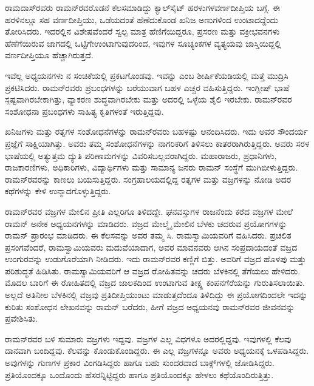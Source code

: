 ರಾಮದಾಸ್‍ರವರು ರಾಮನ್‍ರವರೊಡನೆ ಕೆಲಸಮಾಡಿದ್ದು ಕ್ಯಾಲ್‍ಸೈಟ್ ಹರಳುಗಳ\break ವರ್ಣದೀಪ್ತಿಯ ಬಗ್ಗೆ. ಈ ಹರಳಿನಲ್ಲೂ ಸಹ ವರ್ಣದೀಪ್ತಿಯು, ಒಡೆಯದಂತೆ ಹೆಣೆದುಕೊಂಡ ಖನಿಜ ಅಣುಗಳಿಂದ ಉಂಟಾದದ್ದೆಂದು ತೋರಿಸಿದರು. ಇದರಲ್ಲಿನ ವಿಶೇಷವೆಂದರೆ ಸ್ವಲ್ಪ ಮಾತ್ರ ಹೆಣಿಗೆಯಿದ್ದರೂ, ಪ್ರಸರಣ ಮತ್ತು ವಕ್ರೀಭವನಗಳು ಹೆಣೆಗೆಯಿರುವ ಜಾಗದಲ್ಲಿ ಒಟ್ಟಿಗೇ\break ಉಂಟಾಗುವುದರಿಂದ, ಇವುಗಳ ಸೂಚ್ಯಂಕಗಳ ವ್ಯತ್ಯಯವು ಜಾಸ್ತಿಯಿದ್ದಲ್ಲಿ ವರ್ಣದೀಪ್ತಿಯೂ ಹೆಚ್ಚಾಗಿರುತ್ತದೆ.

ಇವೆಲ್ಲ ಅಧ್ಯಯನಗಳು \textit{}ನ ಸಂಚಿಕೆಯಲ್ಲಿ ಪ್ರಕಟಗೊಂಡವು. ಇವನ್ನು \textit{} ಎಂಬ ಶೀರ್ಷಿಕೆಯಡಿ\-ಯಲ್ಲಿ ಮತ್ತೆ ಮುದ್ರಿಸಿ ಪ್ರಕಟಿಸಿದರು. ರಾಮನ್‍ರವರು ಪ್ರಬಂಧಗಳನ್ನು ಬರೆಯುವಾಗ ಬಹಳ ಎಚ್ಚರ ವಹಿಸುತ್ತಿದ್ದರು. ಇಂಗ್ಲೀಷ್ ಭಾಷೆ ಸ್ಪಷ್ಟವಾಗಿರಬೇಕಾಗಿತ್ತು, ವ್ಯಾಕರಣ ಶುದ್ಧವಾಗಿರಬೇಕು ಮತ್ತು ಅದರಲ್ಲಿ ಒಳ್ಳೆಯ ಶೈಲಿ ಇರಬೇಕು. ರಾಮನ್‍ರವರ ಸಂಶೋಧನಾ ಪ್ರಬಂಧಗಳು ಸಾಹಿತ್ಯ ಕೃತಿಗಳಂತೆ ಇರುತ್ತಿದ್ದವು.

ಖನಿಜಗಳು ಮತ್ತು ರತ್ನಗಳ ಸಂಶೋಧನೆಗಳನ್ನು ರಾಮನ್‍ರವರು ಬಹಳಷ್ಟು ಆನಂದಿಸಿದರು. ಇದು ಅವರ ಸೌಂದರ್ಯ ಪ್ರಜ್ಞೆಗೆ ಸಾಕ್ಷಿಯಾಗಿತ್ತು. ಅವರು ತಮ್ಮ ಸಂಶೋಧನೆಗಳನ್ನು ನಾಗರಿಕರಿಗೆ ತಿಳಿಸಲು ಕಾತರರಾಗಿರುತ್ತಿದ್ದರು. ಅವರು ಸರಳ ಭಾಷೆಯಲ್ಲಿ ಅತ್ಯುತ್ತಮ ದ್ಯುತಿ ಪರಿಣಾಮಗಳನ್ನು ವಿವರಿಸಬಲ್ಲವರಾಗಿದ್ದರು. ಮಹಾರಾಜರು, ಪ್ರಧಾನಿಗಳು, ರಾಜಕಾರಣಿಗಳು, ಅಧಿಕಾರಿಗಳು, ವಿದ್ಯಾರ್ಥಿಗಳು ಮತ್ತು ಸಾಮಾನ್ಯ ಜನರು ರಾಮನ್ ಸಂಸ್ಥೆಗೆ ಮುಗಿಬೀಳುತ್ತಿದ್ದರು. ರಾಮನ್‍ರವರನ್ನು ಕಾಣಲು ಬಯಸುತ್ತಿದ್ದರು. ಸಂಗ್ರಹಾಲಯದಲ್ಲಿದ್ದ ರತ್ನಗಳ ಮತ್ತು ವಜ್ರಗಳನ್ನು ನೋಡಿ ಅದರ ಕಥೆಗಳನ್ನು ಕೇಳಿ ಉನ್ಮಾದಗೊಳ್ಳುತ್ತಿದ್ದರು.



ರಾಮನ್‍ರವರ ವಜ್ರಗಳ ಮೇಲಿನ ಪ್ರೀತಿ ಎಲ್ಲರಿಗೂ ತಿಳಿದದ್ದೇ. ಘನವಸ್ತುಗಳ ರಾಜನೆಂದು ಕರೆದ ವಜ್ರಗಳ ಮೇಲೆ ರಾಮನ್ ಅನೇಕ ಅಧ್ಯಯನಗಳನ್ನು ಮಾಡಿದರು. ವಜ್ರದ ಮೇಲ್ಮೈ ಮೇಲಿನ ಬೆಳಕು ಚದರುವ ಪ್ರಯೋಗಗಳನ್ನು ರಾಮನ್ ಪ್ರಾರಂಭ ಮಾಡಿದರು. ಈ ಕೆಲಸವನ್ನು ಅವರ ತಮ್ಮ ಸಿ. ರಾಮಸ್ವಾಮಿಯವರಿಗೆ ವಹಿಸಿದರು. ಪ್ರಚಲಿತ ಪ್ರಸಂಗವೆಂದರೆ, ರಾಮಸ್ವಾಮಿಯವರು ಮದುವೆಯಾದಾಗ, ಅವರ ಮಾವನವರು ಆಗಿನ ಸಂಪ್ರದಾಯದಂತೆ ವಜ್ರದ ಉಂಗುರವನ್ನು ಉಡುಗೊರೆಯಾಗಿ ನೀಡಿದರು. ಇದು ರಾಮನ್‍ರವರ ಕಣ್ಣಿಗೆ ಬಿತ್ತು. ಅವರಿಗೆ ವಜ್ರದ ಹೊಳಪು ಮತ್ತು ಪರಿಶುದ್ಧತೆ ಹಿಡಿಸಿತು. ರಾಮಸ್ವಾಮಿಯವರಿಗೆ ಆ ವಜ್ರದ ರೋಹಿತವನ್ನು ಚದರು ಬೆಳಕಿನಲ್ಲಿ ತೆಗೆಯಲು ಹೇಳಿದರು. ಮೊದಲ ಬಾರಿಗೆ ಈ ರೋಹಿತದಲ್ಲಿ ವಜ್ರದ ಜಾಲಕದಿಂದ ಉಂಟಾಗುವ ತೀಕ್ಷ್ಣ ಕಂಪನಗೆರೆಯನ್ನು ಗುರುತಿಸಲಾಯಿತು. ಅಲ್ಲದೆ ಅತಿನೀಲ ಬೆಳಕಿನಲ್ಲಿ ವಜ್ರವು ಪ್ರತಿದೀಪ್ತಿಯುಂಟು ಮಾಡುತ್ತದೆಂದೂ ತಿಳಿದಿದ್ದು ಈ ಪ್ರಯೋಗದಿಂದಲೇ ಇದನ್ನು ಕುರಿತು ಸಂಶೋಧನ ಲೇಖನವನ್ನು ರಾಮನ್ ಬರೆದರು, ಹೀಗೆ ವಜ್ರದ ಅಧ್ಯಯನವು ರಾಮನ್‍ರವರ ಜೀವನವನ್ನು ಪ್ರವೇಶಿಸಿತು.

ರಾಮನ್‍ರವರ ಬಳಿ ಸುಮಾರು  ವಜ್ರಗಳು ಇದ್ದವು. ವಜ್ರಗಳ ಎಲ್ಲ ವಿಧಗಳೂ ಅದರಲ್ಲಿದ್ದವು. ಇವುಗಳಲ್ಲಿ ಕೆಲವು ದಾನವಾಗಿ ಬಂದಿದ್ದವು. ಕೆಲವನ್ನು ಕೊಂಡುಕೊಂಡಿದ್ದರು. ಈ ಎಲ್ಲ ವಜ್ರಗಳನ್ನೂ ಅವರು ಅಧ್ಯಯನಕ್ಕೆ ಒಳಪಡಿಸಿದ್ದರು. ಅವುಗಳನ್ನು ಗುಣಗಳ ಪ್ರಕಾರ ವಿಂಗಡಿಸಿದ್ದರು ಹಾಗೂ ಬಹು ಸುಂದರವಾದ ಬಾಕ್ಸ್‌ಗಳಲ್ಲಿ ಜೋಡಿಸಿದ್ದರು. ಪ್ರತಿಯೊಂದಕ್ಕೂ ಒಂದೊಂದು ಹೆಸರನ್ನಿಟ್ಟಿದ್ದರು ಹಾಗೂ ಪ್ರತಿಯೊಂದಕ್ಕೂ ಹೇಳಲು ಕಥೆಯೊಂದಿರುತ್ತಿತ್ತು.

